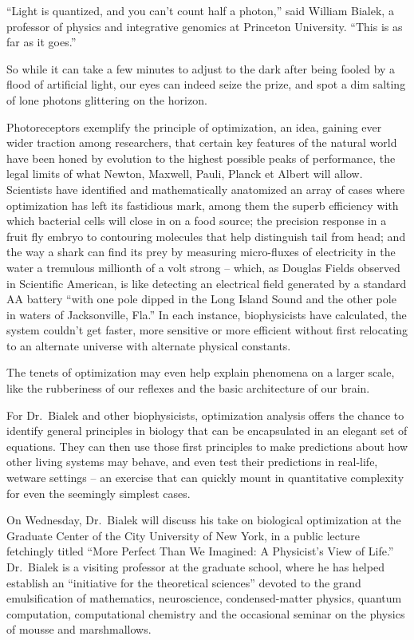 ﻿\documentclass[12pt]{article}
\begin{document}
``Light is quantized, and you can't count half a photon,'' said William Bialek, a professor of
physics and integrative genomics at Princeton University. ``This is as far as it goes.''

So while it can take a few minutes to adjust to the dark after being fooled by a flood of artificial
light, our eyes can indeed seize the prize, and spot a dim salting of lone photons glittering on the
horizon.

Photoreceptors exemplify the principle of optimization, an idea, gaining ever wider traction among
researchers, that certain key features of the natural world have been honed by evolution to the
highest possible peaks of performance, the legal limits of what Newton, Maxwell, Pauli, Planck et
Albert will allow. Scientists have identified and mathematically anatomized an array of cases where
optimization has left its fastidious mark, among them the superb efficiency with which bacterial
cells will close in on a food source; the precision response in a fruit fly embryo to contouring
molecules that help distinguish tail from head; and the way a shark can find its prey by measuring
micro-fluxes of electricity in the water a tremulous millionth of a volt strong -- which, as Douglas
Fields observed in Scientific American, is like detecting an electrical field generated by a
standard AA battery ``with one pole dipped in the Long Island Sound and the other pole in waters of
Jacksonville, Fla.'' In each instance, biophysicists have calculated, the system couldn't get
faster, more sensitive or more efficient without first relocating to an alternate universe with
alternate physical constants.

The tenets of optimization may even help explain phenomena on a larger scale, like the rubberiness
of our reflexes and the basic architecture of our brain.

For Dr.~Bialek and other biophysicists, optimization analysis offers the chance to identify general
principles in biology that can be encapsulated in an elegant set of equations. They can then use
those first principles to make predictions about how other living systems may behave, and even test
their predictions in real-life, wetware settings -- an exercise that can quickly mount in
quantitative complexity for even the seemingly simplest cases.

On Wednesday, Dr.~Bialek will discuss his take on biological optimization at the Graduate Center of
the City University of New York, in a public lecture fetchingly titled ``More Perfect Than We
Imagined: A Physicist's View of Life.'' Dr.~Bialek is a visiting professor at the graduate school,
where he has helped establish an ``initiative for the theoretical sciences'' devoted to the grand
emulsification of mathematics, neuroscience, condensed-matter physics, quantum computation,
computational chemistry and the occasional seminar on the physics of mousse and marshmallows.
\end{document}

